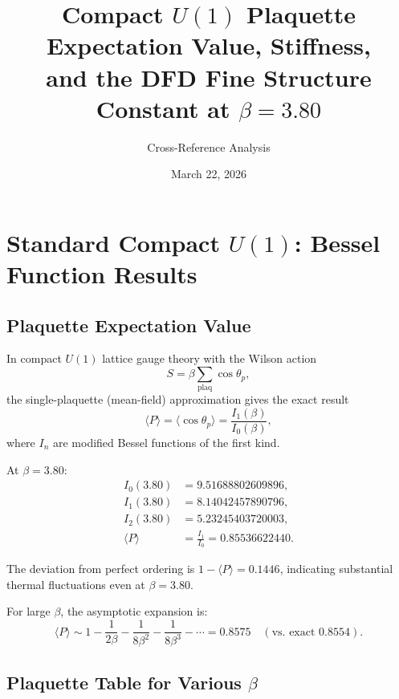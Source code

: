 \documentclass[12pt,a4paper]{article}
\title{Compact $U(1)$ Plaquette Expectation Value, Stiffness,\\
and the DFD Fine Structure Constant at $\beta = 3.80$}
\author{Cross-Reference Analysis}
\date{March 22, 2026}
\begin{document}
\maketitle

\section{Standard Compact $U(1)$: Bessel Function Results}

\subsection{Plaquette Expectation Value}

In compact $U(1)$ lattice gauge theory with the Wilson action
\begin{equation}
  S = \beta \sum_{\text{plaq}} \cos\theta_p,
\end{equation}
the single-plaquette (mean-field) approximation gives the exact result
\begin{equation}
  \langle P \rangle = \langle \cos\theta_p \rangle = \frac{I_1(\beta)}{I_0(\beta)},
  \label{eq:plaquette}
\end{equation}
where $I_n$ are modified Bessel functions of the first kind.

At $\beta = 3.80$:
\begin{align}
  I_0(3.80) &= 9.51688802609896, \\
  I_1(3.80) &= 8.14042457890796, \\
  I_2(3.80) &= 5.23245403720003, \\
  \langle P \rangle &= \frac{I_1}{I_0} = 0.85536622440.
\end{align}

The deviation from perfect ordering is $1 - \langle P \rangle = 0.1446$, indicating
substantial thermal fluctuations even at $\beta = 3.80$.

For large $\beta$, the asymptotic expansion is:
\begin{equation}
  \langle P \rangle \sim 1 - \frac{1}{2\beta} - \frac{1}{8\beta^2} - \frac{1}{8\beta^3} - \cdots
  = 0.8575 \quad (\text{vs.\ exact } 0.8554).
\end{equation}

\subsection{Plaquette Table for Various $\beta$}
\end{document}
